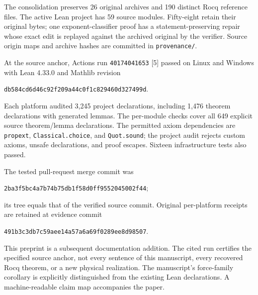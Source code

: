 \documentclass[11pt,a4paper]{article}
\theoremstyle{remark}\newtheorem{remark}[proposition]{Remark}
\newcommand{\code}[1]{\nolinkurl{#1}}
\begin{document}
The consolidation preserves 26 original archives and 190 distinct Rocq reference files. The active Lean project has 59 source modules. Fifty-eight retain their original bytes; one exponent-classifier proof has a statement-preserving repair whose exact edit is replayed against the archived original by the verifier. Source origin maps and archive hashes are committed in \code{provenance/}.

\begin{samepage}
At the source anchor, Actions run \code{40174041653} [5] passed on Linux and Windows with Lean 4.33.0 and Mathlib revision
\begin{center}\small\code{db584cd6d46c92f209a44c0f1c829460d327499d}.\end{center}
\end{samepage}
Each platform audited 3,245 project declarations, including 1,476 theorem declarations with generated lemmas. The per-module checks cover all 649 explicit source theorem/lemma declarations. The permitted axiom dependencies are \code{propext}, \code{Classical.choice}, and \code{Quot.sound}; the project audit rejects custom axioms, unsafe declarations, and proof escapes. Sixteen infrastructure tests also passed.

The tested pull-request merge commit was
\begin{center}\small\code{2ba3f5bc4a7b74b75db1f58d0ff9552045002f44};\end{center}
its tree equals that of the verified source commit. Original per-platform receipts are retained at evidence commit
\begin{center}\small\code{491b3c3db7c59aee14a57a6a69f0289ee8d98507}.\end{center}
This preprint is a subsequent documentation addition. The cited run certifies the specified source anchor, not every sentence of this manuscript, every recovered Rocq theorem, or a new physical realization. The manuscript's force-family corollary is explicitly distinguished from the existing Lean declarations. A machine-readable claim map accompanies the paper.
\end{document}
